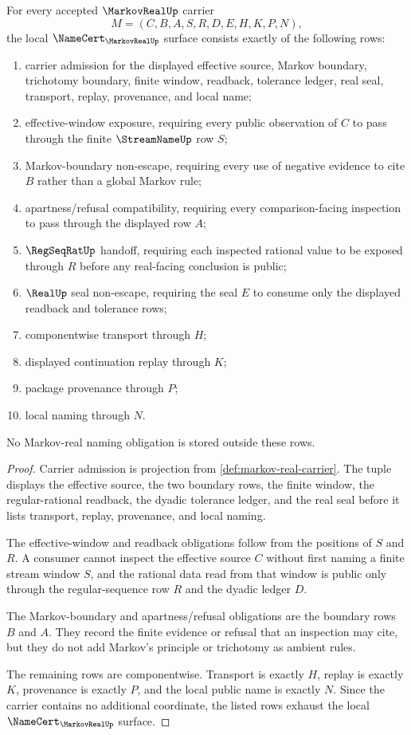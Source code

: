 \begin{theorem}
\label{thm:markov-real-namecert-obligations}
For every accepted $\MarkovRealUp$ carrier
$$
M=(C,B,A,S,R,D,E,H,K,P,N),
$$
the local $\NameCert_{\MarkovRealUp}$ surface consists exactly of the following rows:
\begin{enumerate}
\item carrier admission for the displayed effective source, Markov boundary, trichotomy boundary, finite window, readback, tolerance ledger, real seal, transport, replay, provenance, and local name;
\item effective-window exposure, requiring every public observation of $C$ to pass through the finite $\StreamNameUp$ row $S$;
\item Markov-boundary non-escape, requiring every use of negative evidence to cite $B$ rather than a global Markov rule;
\item apartness/refusal compatibility, requiring every comparison-facing inspection to pass through the displayed row $A$;
\item $\RegSeqRatUp$ handoff, requiring each inspected rational value to be exposed through $R$ before any real-facing conclusion is public;
\item $\RealUp$ seal non-escape, requiring the seal $E$ to consume only the displayed readback and tolerance rows;
\item componentwise transport through $H$;
\item displayed continuation replay through $K$;
\item package provenance through $P$;
\item local naming through $N$.
\end{enumerate}
No Markov-real naming obligation is stored outside these rows.
\end{theorem}
\begin{proof}
Carrier admission is projection from \autoref{def:markov-real-carrier}. The tuple displays the effective source, the two boundary rows, the finite window, the regular-rational readback, the dyadic tolerance ledger, and the real seal before it lists transport, replay, provenance, and local naming.

The effective-window and readback obligations follow from the positions of $S$ and $R$. A consumer cannot inspect the effective source $C$ without first naming a finite stream window $S$, and the rational data read from that window is public only through the regular-sequence row $R$ and the dyadic ledger $D$.

The Markov-boundary and apartness/refusal obligations are the boundary rows $B$ and $A$. They record the finite evidence or refusal that an inspection may cite, but they do not add Markov's principle or trichotomy as ambient rules.

The remaining rows are componentwise. Transport is exactly $H$, replay is exactly $K$, provenance is exactly $P$, and the local public name is exactly $N$. Since the carrier contains no additional coordinate, the listed rows exhaust the local $\NameCert_{\MarkovRealUp}$ surface.
\end{proof}

